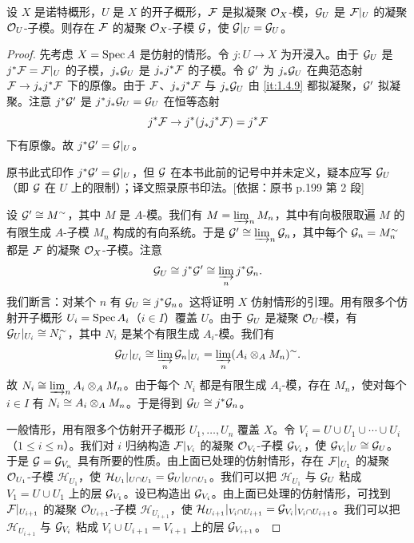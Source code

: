 \begin{lemma}\label{it:2.5.2}
设 $X$ 是诺特概形，$U$ 是 $X$ 的开子概形，$\mathcal{F}$ 是拟凝聚 $\mathcal{O}_X$-模，$\mathcal{G}_U$ 是 $\mathcal{F}|_U$ 的凝聚 $\mathcal{O}_U$-子模。则存在 $\mathcal{F}$ 的凝聚 $\mathcal{O}_X$-子模 $\mathcal{G}$，使 $\mathcal{G}|_U=\mathcal{G}_U$。
\end{lemma}
\begin{proof}
先考虑 $X=\operatorname{Spec} A$ 是仿射的情形。令 $j\colon U\to X$ 为开浸入。由于 $\mathcal{G}_U$ 是 $j^*\mathcal{F}=\mathcal{F}|_U$ 的子模，$j_*\mathcal{G}_U$ 是 $j_*j^*\mathcal{F}$ 的子模。令 $\mathcal{G}'$ 为 $j_*\mathcal{G}_U$ 在典范态射 $\mathcal{F}\to j_*j^*\mathcal{F}$ 下的原像。由于 $\mathcal{F}$、$j_*j^*\mathcal{F}$ 与 $j_*\mathcal{G}_U$ 由 \ref{it:1.4.9} 都拟凝聚，$\mathcal{G}'$ 拟凝聚。注意 $j^*\mathcal{G}'$ 是 $j^*j_*\mathcal{G}_U=\mathcal{G}_U$ 在恒等态射
\[
j^*\mathcal{F}\to j^*(j_*j^*\mathcal{F})=j^*\mathcal{F}
\]
下有原像。故 $j^*\mathcal{G}'=\mathcal{G}|_U$。
\begin{tnote}
原书此式印作 $j^*\mathcal{G}'=\mathcal{G}|_U$，但 $\mathcal{G}$ 在本书此前的记号中并未定义，疑本应写 $\mathcal{G}_U$（即 $\mathcal{G}$ 在 $U$ 上的限制）；译文照录原书印法。[依据：原书 p.199 第 2 段]
\end{tnote}
设 $\mathcal{G}'\cong M^{\sim}$，其中 $M$ 是 $A$-模。我们有 $M=\varinjlim_n M_n$，其中有向极限取遍 $M$ 的有限生成 $A$-子模 $M_n$ 构成的有向系统。于是 $\mathcal{G}'\cong\varinjlim_n\mathcal{G}_n$，其中每个 $\mathcal{G}_n=M_n^{\sim}$ 都是 $\mathcal{F}$ 的凝聚 $\mathcal{O}_X$-子模。注意
\[
\mathcal{G}_U\cong j^*\mathcal{G}'\cong\varinjlim_n j^*\mathcal{G}_n.
\]
我们断言：对某个 $n$ 有 $\mathcal{G}_U\cong j^*\mathcal{G}_n$。这将证明 $X$ 仿射情形的引理。用有限多个仿射开子概形 $U_i=\operatorname{Spec} A_i$（$i\in I$）覆盖 $U$。由于 $\mathcal{G}_U$ 是凝聚 $\mathcal{O}_U$-模，有 $\mathcal{G}_U|_{U_i}\cong N_i^{\sim}$，其中 $N_i$ 是某个有限生成 $A_i$-模。我们有
\[
\mathcal{G}_U|_{U_i}\cong\varinjlim_n\mathcal{G}_n|_{U_i}=\varinjlim_n (A_i\otimes_A M_n)^{\sim}.
\]
故 $N_i\cong\varinjlim_n A_i\otimes_A M_n$。由于每个 $N_i$ 都是有限生成 $A_i$-模，存在 $M_n$，使对每个 $i\in I$ 有 $N_i\cong A_i\otimes_A M_n$。于是得到 $\mathcal{G}_U\cong j^*\mathcal{G}_n$。

一般情形，用有限多个仿射开子概形 $U_1,\dots,U_n$ 覆盖 $X$。令 $V_i=U\cup U_1\cup\cdots\cup U_i$（$1\le i\le n$）。我们对 $i$ 归纳构造 $\mathcal{F}|_{V_i}$ 的凝聚 $\mathcal{O}_{V_i}$-子模 $\mathcal{G}_{V_i}$，使 $\mathcal{G}_{V_i}|_U\cong\mathcal{G}_U$。于是 $\mathcal{G}=\mathcal{G}_{V_n}$ 具有所要的性质。由上面已处理的仿射情形，存在 $\mathcal{F}|_{U_1}$ 的凝聚 $\mathcal{O}_{U_1}$-子模 $\mathcal{H}_{U_1}$，使 $\mathcal{H}_{U_1}|_{U\cap U_1}=\mathcal{G}_U|_{U\cap U_1}$。我们可以把 $\mathcal{H}_{U_1}$ 与 $\mathcal{G}_U$ 粘成 $V_1=U\cup U_1$ 上的层 $\mathcal{G}_{V_1}$。设已构造出 $\mathcal{G}_{V_i}$。由上面已处理的仿射情形，可找到 $\mathcal{F}|_{U_{i+1}}$ 的凝聚 $\mathcal{O}_{U_{i+1}}$-子模 $\mathcal{H}_{U_{i+1}}$，使 $\mathcal{H}_{U_{i+1}}|_{V_i\cap U_{i+1}}=\mathcal{G}_{V_i}|_{V_i\cap U_{i+1}}$。我们可以把 $\mathcal{H}_{U_{i+1}}$ 与 $\mathcal{G}_{V_i}$ 粘成 $V_i\cup U_{i+1}=V_{i+1}$ 上的层 $\mathcal{G}_{V_{i+1}}$。
\end{proof}

